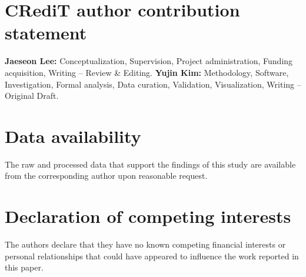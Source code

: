 \documentclass[review,1p,12pt,a4paper]{elsarticle}
\begin{document}
\section*{CRediT author contribution statement}
\textbf{Jaeseon Lee:} Conceptualization, Supervision, Project
administration, Funding acquisition, Writing -- Review \& Editing.
\textbf{Yujin Kim:} Methodology, Software, Investigation, Formal analysis,
Data curation, Validation, Visualization, Writing -- Original Draft.

\section*{Data availability}
The raw and processed data that support the findings of this study are available from the corresponding author upon reasonable request.

\section*{Declaration of competing interests}
The authors declare that they have no known competing financial
interests or personal relationships that could have appeared to
influence the work reported in this paper.


\end{document}
